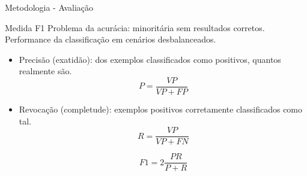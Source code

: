 \documentclass{beamer}
\begin{document}
\begin{frame}{Metodologia - Avaliação}
\setlength\leftmargini{1em}
\begin{block}{Medida F1}
\justifying
Problema da acurácia: minoritária sem resultados corretos. \\
Performance da classificação em cenários desbalanceados.
\begin{itemize}

\item Precisão (exatidão): dos exemplos classificados como positivos, quantos realmente são.
\vspace{-1.5em}
\begin{equation*}
  P = \frac{VP}{VP + FP}
\end{equation*}
\item Revocação (completude): exemplos positivos corretamente classificados como tal. 
\vspace{-0.5em}
\begin{equation*}
  R = \frac{VP}{VP + FN}
\end{equation*}

\pause
\begin{equation*}
  F1 = 2 \frac{PR}{P+R}
\end{equation*}
\end{itemize}
\end{block}
\end{frame}
\end{document}
